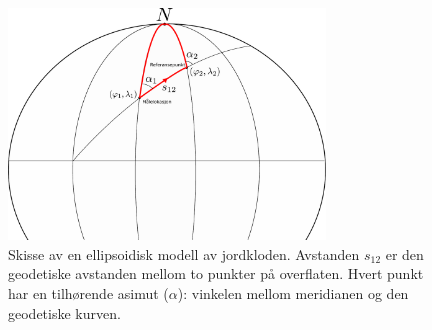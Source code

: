 \begin{figure}
    \centering
    \includegraphics[width=0.75\textwidth]{img/ellipsoidal_problem.pdf}
        \caption{Skisse av en ellipsoidisk modell av jordkloden. Avstanden $s_{12}$ er den geodetiske avstanden mellom to punkter på overflaten. Hvert punkt har en tilhørende asimut ($\alpha$): vinkelen mellom meridianen og den geodetiske kurven.}
    \label{fig:inverse_problem}
\end{figure}
